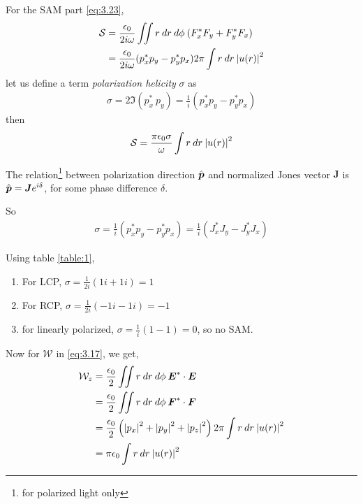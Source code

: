 \documentclass[11pt,a4paper]{article}
\numberwithin{equation}{section}
\begin{document}
For the SAM part \ref{eq:3.23},
\begin{align}
	\mathcal{S} &= \frac{\epsilon_0}{2i\omega}\iint r\:dr\:d\phi\: (F_x^\ast F_y + F_y^\ast F_x)\nonumber\\
	&=\frac{\epsilon_0}{2i\omega} (p_x^\ast p_y- p_y^\ast p_x)2\pi \int r\:dr\: \abs{u(r)}^2
\end{align}
let us define a term \textit{polarization helicity} $\sigma$ as 
\begin{align}
	\sigma = 2\Im(p_x^\ast\: p_y) = \frac{1}{i} (p_x^\ast p_y- p_y^\ast p_x)
\end{align}
then
\begin{align}
	\mathcal{S}
	=\frac{\pi\epsilon_0\sigma }{\omega}\int r\:dr\: \abs{u(r)}^2 \label{eq:3.28}
\end{align}

The relation\footnote{for polarized light only} between polarization direction $\Hat{\boldsymbol{p}}$ and normalized Jones vector $\boldsymbol{J}$ is $\Hat{\boldsymbol{p}} = \boldsymbol{J} e^{i\delta}$, for some phase difference $\delta$.

So
\begin{align}
	\sigma = \frac{1}{i}(p_x^\ast p_y- p_y^\ast p_x)
	=\frac{1}{i}(J_x^\ast J_y- J_y^\ast J_x)
\end{align}

Using table \ref{table:1},
\begin{enumerate}
	\item For LCP, $\sigma = \frac{1}{2i}(1i+1i)=1$
	\item For RCP, $\sigma = \frac{1}{2i}(-1i-1i)=-1$
	\item for linearly polarized, $\sigma = \frac{1}{i}(1-1)=0$, so no SAM.
\end{enumerate}

Now for $\mathcal{W}$ in \ref{eq:3.17}, we get,
\begin{align}
	\mathcal{W}_z &=\frac{\epsilon_0}{2}\iint r\:dr\:d\phi\: \boldsymbol{E}^\ast\cdot\boldsymbol{E}\nonumber\\
	&= \frac{\epsilon_0}{2}\iint r\:dr\:d\phi\: \boldsymbol{F}^\ast\cdot\boldsymbol{F}\nonumber\\
	&=\frac{\epsilon_0}{2} \left(\abs{p_x}^2+\abs{p_y}^2+\abs{p_z}^2\right) 2\pi\int r\:dr\:\abs{u(r)}^2\nonumber\\
	&=\pi\epsilon_0\int r\:dr\:\abs{u(r)}^2 \label{eq:3.31}
\end{align}
\end{document}
